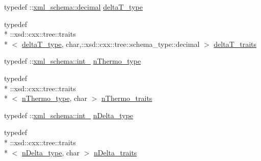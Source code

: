 \begin{DoxyCompactItemize}
\item 
typedef \-::\hyperlink{namespacexml__schema_a69bfaf24f63a8c18ebd8e21db6b343df}{xml\-\_\-schema\-::decimal} \hyperlink{classthermo__t_af616f20681b799198b8c97c235092181}{delta\-T\-\_\-type}
\item 
typedef \\*
\-::xsd\-::cxx\-::tree\-::traits\\*
$<$ \hyperlink{classthermo__t_af616f20681b799198b8c97c235092181}{delta\-T\-\_\-type}, char,\-::xsd\-::cxx\-::tree\-::schema\-\_\-type\-::decimal $>$ \hyperlink{classthermo__t_a06c22e5c3354971550c96f08602ccff6}{delta\-T\-\_\-traits}
\item 
typedef \-::\hyperlink{namespacexml__schema_acfa24ac68e1a188e7f44c36f7a158bf4}{xml\-\_\-schema\-::int\-\_\-} \hyperlink{classthermo__t_a37e4458c88caf30dc0257b65e5f2af94}{n\-Thermo\-\_\-type}
\item 
typedef \\*
\-::xsd\-::cxx\-::tree\-::traits\\*
$<$ \hyperlink{classthermo__t_a37e4458c88caf30dc0257b65e5f2af94}{n\-Thermo\-\_\-type}, char $>$ \hyperlink{classthermo__t_a7733c2995c40646e0c3db3863b4a69ce}{n\-Thermo\-\_\-traits}
\item 
typedef \-::\hyperlink{namespacexml__schema_acfa24ac68e1a188e7f44c36f7a158bf4}{xml\-\_\-schema\-::int\-\_\-} \hyperlink{classthermo__t_a814f5379ac544ebfdb16162514d961c1}{n\-Delta\-\_\-type}
\item 
typedef \\*
\-::xsd\-::cxx\-::tree\-::traits\\*
$<$ \hyperlink{classthermo__t_a814f5379ac544ebfdb16162514d961c1}{n\-Delta\-\_\-type}, char $>$ \hyperlink{classthermo__t_a3e5d5b74c529cbcb267f55385bbb1088}{n\-Delta\-\_\-traits}
\end{DoxyCompactItemize}
